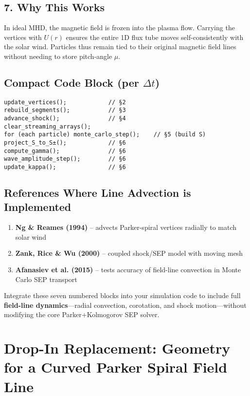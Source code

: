 \subsection*{7. Why This Works}

In ideal MHD, the magnetic field is frozen into the plasma flow. Carrying the vertices with $U(r)$ ensures the entire 1D flux tube moves self-consistently with the solar wind. Particles thus remain tied to their original magnetic field lines without needing to store pitch-angle $\mu$.

\subsection*{Compact Code Block (per $\Delta t$)}

\begin{lstlisting}
update_vertices();            // §2
rebuild_segments();           // §3
advance_shock();              // §4
clear_streaming_arrays();
for (each particle) monte_carlo_step();    // §5 (build S)
project_S_to_S±();            // §6
compute_gamma();              // §6
wave_amplitude_step();        // §6
update_kappa();               // §6
\end{lstlisting}

\subsection*{References Where Line Advection is Implemented}

\begin{enumerate}
    \item \textbf{Ng \& Reames (1994)} – advects Parker-spiral vertices radially to match solar wind
    \item \textbf{Zank, Rice \& Wu (2000)} – coupled shock/SEP model with moving mesh
    \item \textbf{Afanasiev et al. (2015)} – tests accuracy of field-line convection in Monte Carlo SEP transport
\end{enumerate}

Integrate these seven numbered blocks into your simulation code to include full \textbf{field-line dynamics}—radial convection, corotation, and shock motion—without modifying the core Parker+Kolmogorov SEP solver.

\section*{Drop-In Replacement: Geometry for a Curved Parker Spiral Field Line}

